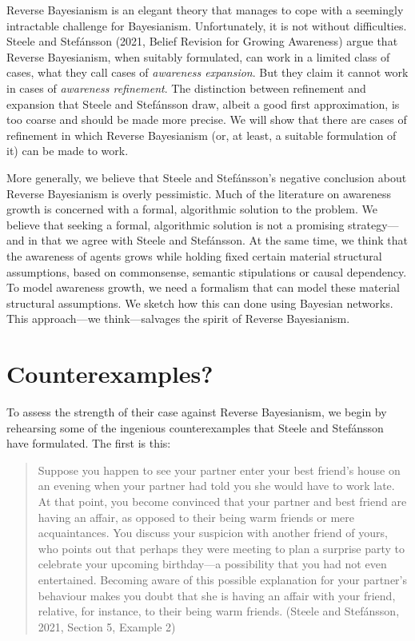 \documentclass[
  11pt,
  dvipsnames,enabledeprecatedfontcommands]{scrartcl}
\begin{document}
Reverse Bayesianism is an elegant theory that manages to cope with a
seemingly intractable challenge for Bayesianism. Unfortunately, it is
not without difficulties. Steele and Stefánsson (2021, Belief Revision
for Growing Awareness) argue that Reverse Bayesianism, when suitably
formulated, can work in a limited class of cases, what they call cases
of \textit{awareness expansion}. But they claim it cannot work in cases
of \textit{awareness refinement}. The distinction between refinement and
expansion that Steele and Stefánsson draw, albeit a good first
approximation, is too coarse and should be made more precise. We will
show that there are cases of refinement in which Reverse Bayesianism
(or, at least, a suitable formulation of it) can be made to work.

More generally, we believe that Steele and Stefánsson's negative
conclusion about Reverse Bayesianism is overly pessimistic. Much of the
literature on awareness growth is concerned with a formal, algorithmic
solution to the problem. We believe that seeking a formal, algorithmic
solution is not a promising strategy---and in that we agree with Steele
and Stefánsson. At the same time, we think that the awareness of agents
grows while holding fixed certain material structural assumptions, based
on commonsense, semantic stipulations or causal dependency. To model
awareness growth, we need a formalism that can model these material
structural assumptions. We sketch how this can done using Bayesian
networks. This approach---we think---salvages the spirit of Reverse
Bayesianism.

\hypertarget{counterexamples}{%
\section{Counterexamples?}\label{counterexamples}}

To assess the strength of their case against Reverse Bayesianism, we
begin by rehearsing some of the ingenious counterexamples that Steele
and Stefánsson have formulated. The first is this:

\begin{quote}
Suppose you happen to see your partner enter your best friend's house on
an evening when your partner had told you she would have to work late.
At that point, you become convinced that your partner and best friend
are having an affair, as opposed to their being warm friends or mere
acquaintances. You discuss your suspicion with another friend of yours,
who points out that perhaps they were meeting to plan a surprise party
to celebrate your upcoming birthday---a possibility that you had not
even entertained. Becoming aware of this possible explanation for your
partner's behaviour makes you doubt that she is having an affair with
your friend, relative, for instance, to their being warm friends.
(Steele and Stefánsson, 2021, Section 5, Example 2)
\end{quote}
\end{document}
